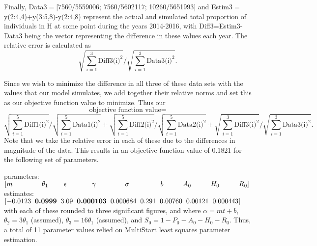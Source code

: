 \documentclass[12pt]{article}
\begin{document}
 
 Finally, Data3$=$[7560/5559006; 7560/5602117; 10260/5651993] and  Estim3$=$y(2:4,4)+y(3:5,8)-y(2:4,8) represent the actual and simulated total proportion of individuals in H at some point during the years 2014-2016, with Diff3=Estim3-Data3 being the vector representing the difference in these values each year. The relative error is calculated as 
 $$\displaystyle \sqrt{\sum_{i=1}^{3} \text{Diff3(i)}^2} / {\displaystyle \sqrt{\sum_{i=1}^{3} \text{Data3(i)}^2}}.$$

Since we wish to minimize the difference in all three of these data sets with the values that our model simulates, we add together their relative norms and set this as our objective function value to minimize. Thus our 
$$\text{objective function value}=$$
 $$\displaystyle \sqrt{\sum_{i=1}^{5} \text{Diff1(i)}^2} / \displaystyle \sqrt{\sum_{i=1}^{5} \text{Data1(i)}^2} + \displaystyle \sqrt{\sum_{i=1}^{5} \text{Diff2(i)}^2} / \displaystyle \sqrt{\sum_{i=1}^{5} \text{Data2(i)}^2} + \displaystyle \sqrt{\sum_{i=1}^{3} \text{Diff3(i)}^2} / \displaystyle \sqrt{\sum_{i=1}^{3} \text{Data3(i)}^2}.$$
Note that we take the relative error in each of these due to the differences in magnitude of the data. %
This results in an objective function value of 0.1821 for the following set of parameters. 

parameters: $[m \hspace{1.5cm}   \theta_1 \hspace{0.8cm}   \epsilon \hspace{1.3cm} \gamma \hspace{1.5cm}  \sigma \hspace{1.6cm}   b \hspace{1cm}    A_0 \hspace{1cm}   H_0  \hspace{1cm}   R_0 ]$ \\
estimates: $[-0.0123 \hspace{0.2cm}     \textbf{0.0999}  \hspace{0.2cm}      3.09  \hspace{0.2cm}    \textbf{0.000103}     \hspace{0.2cm}           0.000684 \hspace{0.2cm}     0.291 \hspace{0.2cm}   0.00760    \hspace{0.2cm}         0.00121 \hspace{0.2cm}  0.000443   ]$ \\
with each of these rounded to three significant figures, and where $\alpha=mt+b$, $\theta_2=3 \theta_1$ (assumed), $\theta_3=16\theta_1$ (assumed), and $S_0=1-P_0-A_0-H_0-R_0.$ Thus, a total of 11 parameter values relied on MultiStart least squares parameter estimation. 
\end{document}

